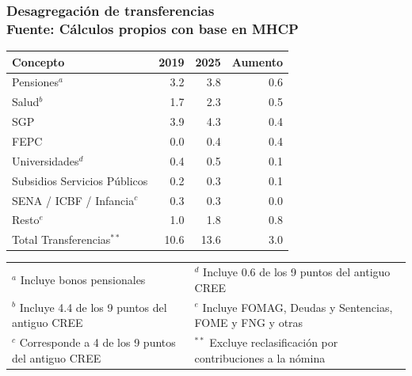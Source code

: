 \begin{frame}

\frametitle{Desagregación de transferencias \\ \small{Fuente: Cálculos propios con base en MHCP}}
\begin{center}
\begin{table}
\centering
\small
\renewcommand{\arraystretch}{1.15}
\begin{tabular}{l r r r}
\hline
\textbf{Concepto} & \textbf{2019} & \textbf{2025} & \textbf{Aumento} \\
\hline
Pensiones$^{a}$ & 3.2 & 3.8 & 0.6 \\
Salud$^{b}$ & 1.7 & 2.3 & 0.5 \\
SGP & 3.9 & 4.3 & 0.4 \\
FEPC & 0.0 & 0.4 & 0.4 \\
Universidades$^{d}$ & 0.4 & 0.5 & 0.1 \\
Subsidios Servicios P\'ublicos & 0.2 & 0.3 & 0.1 \\
SENA / ICBF / Infancia$^{c}$ & 0.3 & 0.3 & 0.0 \\
Resto$^{e}$ & 1.0 & 1.8 & 0.8 \\
\hline
Total Transferencias$^{**}$ & 10.6 & 13.6 & 3.0 \\
\hline
\end{tabular}
\end{table}

\vspace{0.12cm}
{\footnotesize
\begin{tabular}{@{}p{}@{\hspace{0.04\textwidth}}p{}@{}}
$^{a}$ \tiny Incluye bonos pensionales &
$^{d}$ \tiny Incluye 0.6 de los 9 puntos del antiguo CREE \\
$^{b}$ \tiny Incluye 4.4 de los 9 puntos del antiguo CREE &
$^{e}$ \tiny Incluye FOMAG, Deudas y Sentencias, FOME y FNG y otras\\
$^{c}$ \tiny Corresponde a 4 de los 9 puntos del antiguo CREE &
$^{**}$ \tiny Excluye reclasificaci\'on por contribuciones a la n\'omina \\
\end{tabular}
}
\end{center}
\end{frame}
